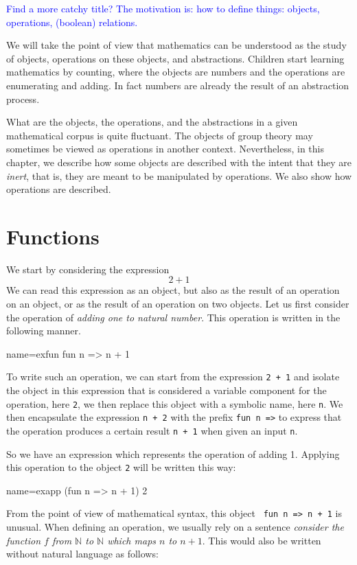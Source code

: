 \label{ch:prog}

\textcolor{blue}{Find a more catchy title? The motivation is: how to define things:
objects, operations, (boolean) relations.}

We will take the point of view that mathematics can be understood as
the study of objects, operations on these objects, and abstractions.  
Children start learning mathematics by counting, where the objects are
numbers and the operations are enumerating and adding.  In fact
numbers are already the result of an abstraction process.

What are the objects, the operations, and the abstractions in a given
mathematical corpus is quite fluctuant.  The objects of group theory
may sometimes be viewed as operations in another context.  Nevertheless,
in this chapter, we describe how some objects are described with the intent
that they are {\em inert}, that is, they are meant to be
manipulated by operations.  We also show how operations are described.

\section{Functions}
We start by considering the expression
\[ 2 + 1 \]
We can read this expression as an object, but also as the result of an
operation on an object, or as the result of an operation on two
objects.  Let us first consider the operation of {\em adding one to
  natural number}.  This operation is written in the following manner.

\begin{coq}{name=exfun}{}
  fun n => n + 1
\end{coq}
To write such an operation, we can start from the expression {\tt 2 +
  1} and isolate the object in this expression that is considered a
variable component for the operation, here {\tt 2}, we then replace
this object with a symbolic name, here {\tt n}.  We then encapsulate
the expression {\tt n + 2} with the prefix {\tt fun n =>} to express
that the operation produces a certain result {\tt n + 1} when given an
input {\tt n}.

So we have an expression which represents the operation of adding 1.
Applying this operation to the object {\tt 2} will be written this
way:

\begin{coq}{name=exapp}{}
  (fun n => n + 1) 2
\end{coq}
From the point of view of mathematical syntax, this object {\tt
  fun n => n + 1} is unusual.  When defining an operation, we usually
rely on a sentence {\em consider the function \(f\) from {\(\mathbb{N}\)}
to {\(\mathbb{N}\)} which maps \(n\) to \(n + 1\)}.  This would also be
written without natural language as follows:


